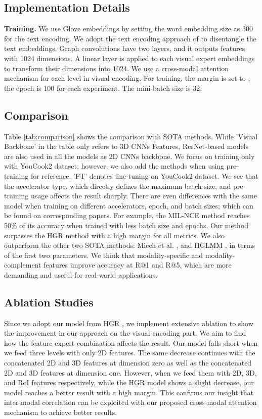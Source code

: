 \documentclass{article}
\begin{document}
\subsection{Implementation Details}

\textbf{Training.} We use Glove embeddings \cite{pennington-etal-2014-glove} by setting the word embedding size as 300 for the text encoding. We adopt the text encoding approach of \cite{Chen_2020_CVPR} to disentangle the text embeddings. Graph convolutions have two layers, and it outputs features with 1024 dimensions. A linear layer is applied to each visual expert embeddings to transform their dimensions into 1024. We use a cross-modal attention mechanism for each level in visual encoding. For training, the margin is set to ; the epoch is 100 for each experiment. The mini-batch size is 32.   

\subsection{Comparison}

Table \ref{tab:comparison} shows the comparison with SOTA methods. While 'Visual Backbone' in the table only refers to 3D CNNs Features, ResNet-based models are also used in all the models as 2D CNNs backbone. We focus on training only with YouCook2 dataset; however, we also add the methods when using pre-training for reference.  ’FT’ denotes fine-tuning on YouCook2 dataset. We see that the accelerator type, which directly defines the maximum batch size, and pre-training usage affects the result sharply. There are even differences with the same model when training on different accelerators, epoch, and batch sizes; which can be found on corresponding papers. For example, the MIL-NCE method reaches 50\% of its accuracy when trained with less batch size and epochs. Our method surpasses the HGR method \cite{Chen_2020_CVPR} with a high margin for all metrics. We also outperform the other two SOTA methods: Miech et al. \cite{miech19howto100m}, and HGLMM \cite{hglmm}, in terms of the first two parameters. We think that modality-specific and modality-complement features improve accuracy at R@1 and R@5, which are more demanding and useful for real-world applications.

\subsection{Ablation Studies}

Since we adopt our model from HGR \cite{Chen_2020_CVPR}, we implement extensive ablation to show the improvement in our approach on the visual encoding part. We aim to find how the feature expert combination affects the result. Our model falls short when we feed three levels with only 2D features. The same decrease continues with the concatenated 2D and 3D features at dimension zero as well as the concatenated 2D and 3D features at dimension one. However, when we feed them with 2D, 3D, and RoI features respectively, while the HGR model shows a slight decrease, our model reaches a better result with a high margin. This confirms our insight that inter-modal correlation can be exploited with our proposed cross-modal attention mechanism to achieve better results.
\end{document}
